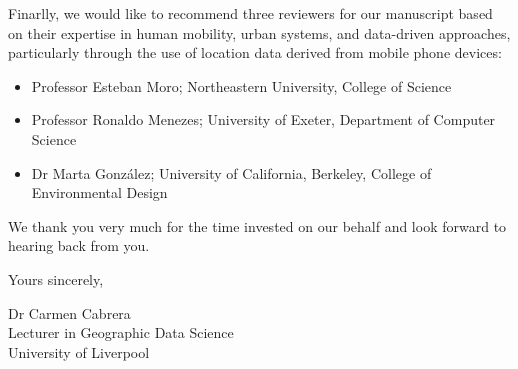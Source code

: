 \documentclass[fleqn,10pt]{letter}
\begin{document}

Finarlly, we would like to recommend three reviewers for our manuscript based on their expertise in human mobility, urban systems, and data-driven approaches, particularly through the use of location data derived from mobile phone devices:
\begin{itemize}
    \vspace{-1mm}
    \item Professor Esteban Moro; Northeastern University, College of Science
    \vspace{-1mm}
    \item Professor Ronaldo Menezes; University of Exeter, Department of Computer Science
    \vspace{-1mm}
    \item Dr Marta González; University of California, Berkeley, College of Environmental Design
\end{itemize}
\vspace{-1mm}
We thank you very much for the time invested on our behalf and look forward to hearing back from you.

Yours sincerely,

Dr Carmen Cabrera\\
Lecturer in Geographic Data Science\\
University of Liverpool
\end{document}
